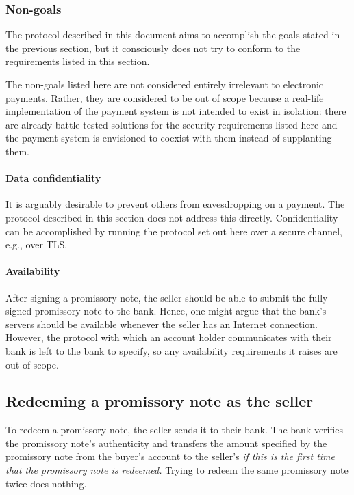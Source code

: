 \documentclass[12pt,a4paper]{article}
\begin{document}
\begin{multicols}{2}
	\subsubsection{Non-goals}

	The protocol described in this document aims to accomplish the goals stated in the previous section, but it consciously does not try to conform to the requirements listed in this section.

	The non-goals listed here are not considered entirely irrelevant to electronic payments. Rather, they are considered to be out of scope because a real-life implementation of the payment system is not intended to exist in isolation: there are already battle-tested solutions for the security requirements listed here and the payment system is envisioned to coexist with them instead of supplanting them.

	\paragraph{Data confidentiality}

	It is arguably desirable to prevent others from eavesdropping on a payment. The protocol described in this section does not address this directly. Confidentiality can be accomplished by running the protocol set out here over a secure channel, e.g., over TLS.

	\paragraph{Availability}

	After signing a promissory note, the seller should be able to submit the fully signed promissory note to the bank. Hence, one might argue that the bank's servers should be available whenever the seller has an Internet connection. However, the protocol with which an account holder communicates with their bank is left to the bank to specify, so any availability requirements it raises are out of scope.

	\subsection{Redeeming a promissory note as the seller}

	To redeem a promissory note, the seller sends it to their bank. The bank verifies the promissory note's authenticity and transfers the amount specified by the promissory note from the buyer's account to the seller's \emph{if this is the first time that the promissory note is redeemed.} Trying to redeem the same promissory note twice does nothing.
	

\end{multicols}
\end{document}
